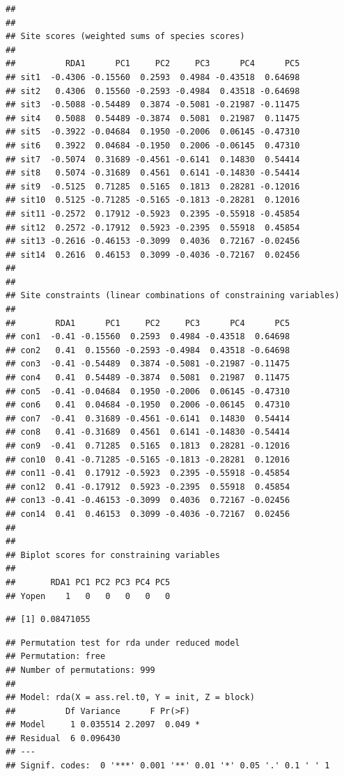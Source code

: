 \documentclass[
]{article}
\begin{document}
\begin{verbatim}
## 
## 
## Site scores (weighted sums of species scores)
## 
##          RDA1      PC1     PC2     PC3      PC4      PC5
## sit1  -0.4306 -0.15560  0.2593  0.4984 -0.43518  0.64698
## sit2   0.4306  0.15560 -0.2593 -0.4984  0.43518 -0.64698
## sit3  -0.5088 -0.54489  0.3874 -0.5081 -0.21987 -0.11475
## sit4   0.5088  0.54489 -0.3874  0.5081  0.21987  0.11475
## sit5  -0.3922 -0.04684  0.1950 -0.2006  0.06145 -0.47310
## sit6   0.3922  0.04684 -0.1950  0.2006 -0.06145  0.47310
## sit7  -0.5074  0.31689 -0.4561 -0.6141  0.14830  0.54414
## sit8   0.5074 -0.31689  0.4561  0.6141 -0.14830 -0.54414
## sit9  -0.5125  0.71285  0.5165  0.1813  0.28281 -0.12016
## sit10  0.5125 -0.71285 -0.5165 -0.1813 -0.28281  0.12016
## sit11 -0.2572  0.17912 -0.5923  0.2395 -0.55918 -0.45854
## sit12  0.2572 -0.17912  0.5923 -0.2395  0.55918  0.45854
## sit13 -0.2616 -0.46153 -0.3099  0.4036  0.72167 -0.02456
## sit14  0.2616  0.46153  0.3099 -0.4036 -0.72167  0.02456
## 
## 
## Site constraints (linear combinations of constraining variables)
## 
##        RDA1      PC1     PC2     PC3      PC4      PC5
## con1  -0.41 -0.15560  0.2593  0.4984 -0.43518  0.64698
## con2   0.41  0.15560 -0.2593 -0.4984  0.43518 -0.64698
## con3  -0.41 -0.54489  0.3874 -0.5081 -0.21987 -0.11475
## con4   0.41  0.54489 -0.3874  0.5081  0.21987  0.11475
## con5  -0.41 -0.04684  0.1950 -0.2006  0.06145 -0.47310
## con6   0.41  0.04684 -0.1950  0.2006 -0.06145  0.47310
## con7  -0.41  0.31689 -0.4561 -0.6141  0.14830  0.54414
## con8   0.41 -0.31689  0.4561  0.6141 -0.14830 -0.54414
## con9  -0.41  0.71285  0.5165  0.1813  0.28281 -0.12016
## con10  0.41 -0.71285 -0.5165 -0.1813 -0.28281  0.12016
## con11 -0.41  0.17912 -0.5923  0.2395 -0.55918 -0.45854
## con12  0.41 -0.17912  0.5923 -0.2395  0.55918  0.45854
## con13 -0.41 -0.46153 -0.3099  0.4036  0.72167 -0.02456
## con14  0.41  0.46153  0.3099 -0.4036 -0.72167  0.02456
## 
## 
## Biplot scores for constraining variables
## 
##       RDA1 PC1 PC2 PC3 PC4 PC5
## Yopen    1   0   0   0   0   0
\end{verbatim}

\begin{verbatim}
## [1] 0.08471055
\end{verbatim}

\begin{verbatim}
## Permutation test for rda under reduced model
## Permutation: free
## Number of permutations: 999
## 
## Model: rda(X = ass.rel.t0, Y = init, Z = block)
##          Df Variance      F Pr(>F)  
## Model     1 0.035514 2.2097  0.049 *
## Residual  6 0.096430                
## ---
## Signif. codes:  0 '***' 0.001 '**' 0.01 '*' 0.05 '.' 0.1 ' ' 1
\end{verbatim}
\end{document}
